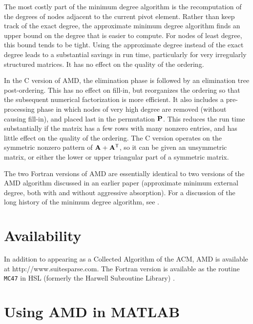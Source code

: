 \documentclass[11pt]{article}
\newcommand{\m}[1]{{\bf{#1}}}       %
\newcommand{\tr}{^{\sf T}}          %
\begin{document}
The most costly part of the minimum degree algorithm is the recomputation
of the degrees of nodes adjacent to the current pivot element.
Rather than keep track of the exact degree, the approximate minimum degree
algorithm finds an upper bound on the degree that is easier to compute.
For nodes of least degree, this bound tends to be tight.  Using the
approximate degree instead of the exact degree leads to a substantial savings
in run time, particularly for very irregularly structured matrices.
It has no effect on the quality of the ordering.

In the C version of AMD, the elimination phase is followed by an
elimination tree post-ordering.  This has no effect on fill-in, but
reorganizes the ordering so that the subsequent numerical factorization is
more efficient.  It also includes a pre-processing phase in which nodes of
very high degree are removed (without causing fill-in), and placed last in the
permutation $\m{P}$.  This reduces the run time substantially if the matrix
has a few rows with many nonzero entries, and has little effect on the quality
of the ordering.
The C version operates on the
symmetric nonzero pattern of $\m{A}+\m{A}\tr$, so it can be given
an unsymmetric matrix, or either the lower or upper triangular part of
a symmetric matrix.

The two Fortran versions of AMD are essentially identical to two versions of
the AMD algorithm discussed in an earlier paper \cite{AmestoyDavisDuff96}
(approximate minimum external degree, both with and without aggressive
absorption).
For a discussion of the long history of the minimum degree algorithm,
see \cite{GeorgeLiu89}.

\section{Availability}

In addition to appearing as a Collected Algorithm of the ACM, \newline
AMD is available at http://www.suitesparse.com.
The Fortran version is available as the routine {\tt MC47} in HSL
(formerly the Harwell Subroutine Library) \cite{hsl:2002}.

\section{Using AMD in MATLAB}
\end{document}
